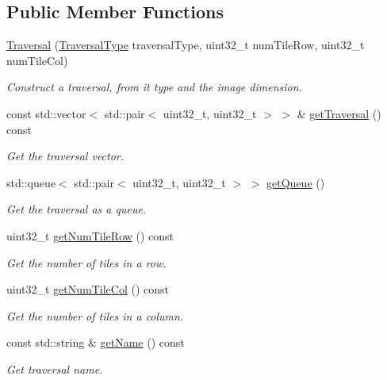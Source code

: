 \subsection*{Public Member Functions}
\begin{DoxyCompactItemize}
\item 
\hyperlink{classfi_1_1Traversal_a789f0f9a1641ac219367922fb9fc8fb0}{Traversal} (\hyperlink{namespacefi_a7ba5ce68668e7f273b22e5f56ca6dfcb}{Traversal\+Type} traversal\+Type, uint32\+\_\+t num\+Tile\+Row, uint32\+\_\+t num\+Tile\+Col)
\begin{DoxyCompactList}\small\item\em Construct a traversal, from it type and the image dimension. \end{DoxyCompactList}\item 
const std\+::vector$<$ std\+::pair$<$ uint32\+\_\+t, uint32\+\_\+t $>$ $>$ \& \hyperlink{classfi_1_1Traversal_a5642cddfccb1e3b914615771164511f1}{get\+Traversal} () const
\begin{DoxyCompactList}\small\item\em Get the traversal vector. \end{DoxyCompactList}\item 
std\+::queue$<$ std\+::pair$<$ uint32\+\_\+t, uint32\+\_\+t $>$ $>$ \hyperlink{classfi_1_1Traversal_a98b73bee5830777b04e3757fb940209a}{get\+Queue} ()
\begin{DoxyCompactList}\small\item\em Get the traversal as a queue. \end{DoxyCompactList}\item 
uint32\+\_\+t \hyperlink{classfi_1_1Traversal_aa9489ae5b18fc732ea70e45660f5650c}{get\+Num\+Tile\+Row} () const
\begin{DoxyCompactList}\small\item\em Get the number of tiles in a row. \end{DoxyCompactList}\item 
uint32\+\_\+t \hyperlink{classfi_1_1Traversal_a10eeefd5098ddd5871617d4df9875255}{get\+Num\+Tile\+Col} () const
\begin{DoxyCompactList}\small\item\em Get the number of tiles in a column. \end{DoxyCompactList}\item 
const std\+::string \& \hyperlink{classfi_1_1Traversal_a691f480264eac83358cba0465faeb0ff}{get\+Name} () const
\begin{DoxyCompactList}\small\item\em Get traversal name. \end{DoxyCompactList}\end{DoxyCompactItemize}

